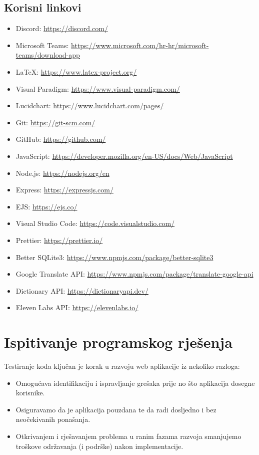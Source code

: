 		\subsection*{Korisni linkovi}
			\begin{itemize}
				\item Discord: \url{https://discord.com/}
				\item Microsoft Teams: \url{https://www.microsoft.com/hr-hr/microsoft-teams/download-app}
				\item LaTeX: \url{https://www.latex-project.org/}
				\item Visual Paradigm: \url{https://www.visual-paradigm.com/}
				\item Lucidchart: \url{https://www.lucidchart.com/pages/}
				\item Git: \url{https://git-scm.com/}
				\item GitHub: \url{https://github.com/}
				\item JavaScript: \url{https://developer.mozilla.org/en-US/docs/Web/JavaScript}
				\item Node.js: \url{https://nodejs.org/en}
				\item Express: \url{https://expressjs.com/}
				\item EJS: \url{https://ejs.co/}
				\item Visual Studio Code: \url{https://code.visualstudio.com/}
				\item Prettier: \url{https://prettier.io/}
				\item Better SQLite3: \url{https://www.npmjs.com/package/better-sqlite3}
				\item Google Translate API: \url{https://www.npmjs.com/package/translate-google-api}
				\item Dictionary API: \url{https://dictionaryapi.dev/}
				\item Eleven Labs API: \url{https://elevenlabs.io/}
			\end{itemize}

				
			\eject 
		
	
		\section{Ispitivanje programskog rješenja}

			Testiranje koda ključan je korak u razvoju web aplikacije iz nekoliko razloga:
			\begin{itemize}
				\item Omogućava identifikaciju i ispravljanje grešaka prije no što aplikacija dosegne korisnike.
				\item Osiguravamo da je aplikacija pouzdana te da radi dosljedno i bez neočekivanih ponašanja.
				\item Otkrivanjem i rješavanjem problema u ranim fazama razvoja smanjujemo troškove održavanja (i podrške) nakon implementacije.
			\end{itemize}


